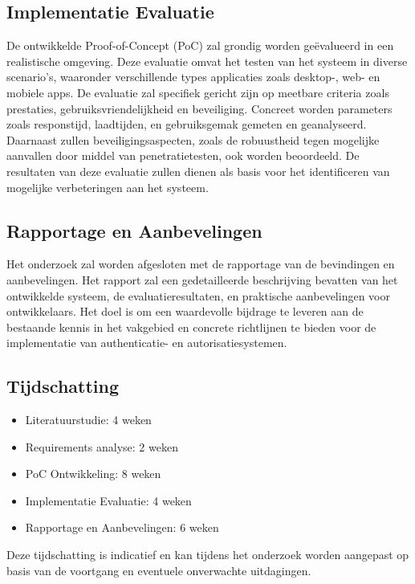 \subsection{Implementatie Evaluatie}

De ontwikkelde Proof-of-Concept (PoC) zal grondig worden geëvalueerd in een realistische omgeving. Deze evaluatie omvat het testen van het systeem in 
diverse scenario's, waaronder verschillende types applicaties zoals desktop-, web- en mobiele apps. De evaluatie zal specifiek gericht zijn op meetbare 
criteria zoals prestaties, gebruiksvriendelijkheid en beveiliging. Concreet worden parameters zoals responstijd, laadtijden, en gebruiksgemak gemeten en 
geanalyseerd. Daarnaast zullen beveiligingsaspecten, zoals de robuustheid tegen mogelijke aanvallen door middel van penetratietesten, ook worden beoordeeld. 
De resultaten van deze evaluatie zullen dienen als basis voor het identificeren van mogelijke verbeteringen aan het systeem.

\subsection{Rapportage en Aanbevelingen}

Het onderzoek zal worden afgesloten met de rapportage van de bevindingen en aanbevelingen. Het rapport zal een gedetailleerde beschrijving bevatten 
van het ontwikkelde systeem, de evaluatieresultaten, en praktische aanbevelingen voor ontwikkelaars. Het doel is om een waardevolle bijdrage te leveren 
aan de bestaande kennis in het vakgebied en concrete richtlijnen te bieden voor de implementatie van authenticatie- en autorisatiesystemen.

\subsection{Tijdschatting}

\begin{itemize}
\item Literatuurstudie: 4 weken
\item Requirements analyse: 2 weken
\item PoC Ontwikkeling: 8 weken
\item Implementatie Evaluatie: 4 weken
\item Rapportage en Aanbevelingen: 6 weken
\end{itemize}

Deze tijdschatting is indicatief en kan tijdens het onderzoek worden aangepast op basis van de voortgang en eventuele onverwachte uitdagingen.

